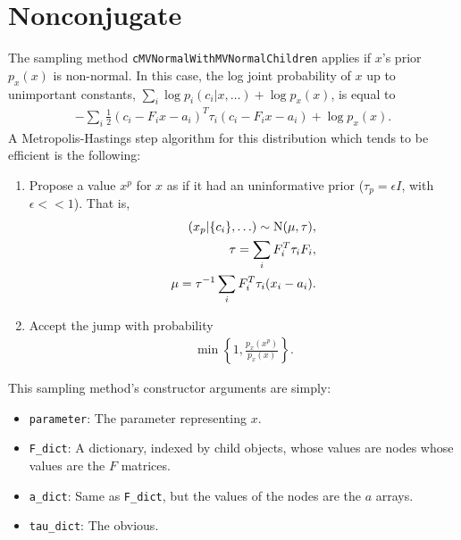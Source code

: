 \documentclass{article}
\begin{document}
\section{Nonconjugate}\label{non}
The sampling method \texttt{cMVNormalWithMVNormalChildren} applies if $x$'s prior $p_x(x)$ is non-normal. In this case, the log joint probability of $x$ up to unimportant constants, $\sum_i \log p_i(c_i|x,\ldots) + \log p_x(x)$, is equal to
\begin{eqnarray*}
	-\sum_i\frac{1}{2}(c_i-F_ix-a_i)^T\tau_i(c_i-F_ix-a_i) +\log p_x(x).
\end{eqnarray*}
A Metropolis-Hastings step algorithm for this distribution which tends to be efficient is the following:
\begin{enumerate}
	\item Propose a value $x^p$ for $x$ as if it had an uninformative prior ($\tau_p = \epsilon I$, with $\epsilon << 1$). That is,
	\begin{eqnarray*}
		(x_p|\{c_i\},\ldots)\sim\textup{N}(\mu,\tau),\\
		\tau = \sum_i F_i^T \tau_i F_i,\\
		\mu = \tau^{-1}\sum_i F_i^T\tau_i(x_i-a_i).
	\end{eqnarray*}	
	\item Accept the jump with probability
	\begin{eqnarray*}
		\min\left\{1,\frac{p_x(x^p)}{p_x(x)}\right\}.
	\end{eqnarray*}
\end{enumerate}

This sampling method's constructor arguments are simply:
\begin{itemize}
	\item \texttt{parameter}: The parameter representing $x$. 
	\item \texttt{F\_dict}: A dictionary, indexed by child objects, whose values are nodes whose values are the $F$ matrices. 
	\item \texttt{a\_dict}: Same as \texttt{F\_dict}, but the values of the nodes are the $a$ arrays.
	\item \texttt{tau\_dict}: The obvious.
\end{itemize}
\end{document}
